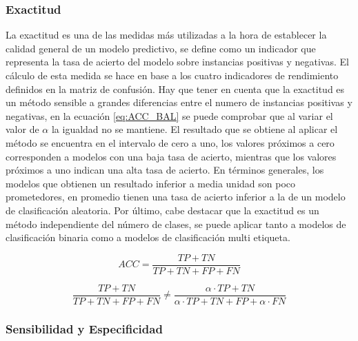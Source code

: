 \subsubsection{Exactitud}

La exactitud \cite{tharwat_2018} es una de las medidas más utilizadas a la hora de establecer la calidad general de un modelo predictivo, se define como un indicador que representa la tasa de acierto del modelo sobre instancias positivas y negativas. El cálculo de esta medida se hace en base a los cuatro indicadores de rendimiento definidos en la matriz de confusión. Hay que tener en cuenta que la exactitud es un método sensible a grandes diferencias entre el numero de instancias positivas y negativas, en la ecuación \ref{eq:ACC_BAL} se puede comprobar que al variar el valor de $\alpha$ la igualdad no se mantiene. El resultado que se obtiene al aplicar el método se encuentra en el intervalo de cero a uno, los valores próximos a cero corresponden a modelos con una baja tasa de acierto, mientras que los valores próximos a uno indican una alta tasa de acierto. En términos generales, los modelos que obtienen un resultado inferior a media unidad son poco prometedores, en promedio tienen una tasa de acierto inferior a la de un modelo de clasificación aleatoria. Por último, cabe destacar que la exactitud es un método independiente del número de clases, se puede aplicar tanto a modelos de clasificación binaria como a modelos de clasificación multi etiqueta.

\bigbreak

\begin{equation}
    ACC = \frac{TP+TN}{TP+TN+FP+FN}
    \label{eq:ACC}  
\end{equation}

\bigbreak

\begin{equation}
    \frac{TP+TN}{TP+TN+FP+FN}\neq \frac{ \alpha \cdot TP+TN}{\alpha \cdot TP+TN+FP+ \alpha \cdot FN}
    \label{eq:ACC_BAL}  
\end{equation}



\subsubsection{Sensibilidad y Especificidad}

